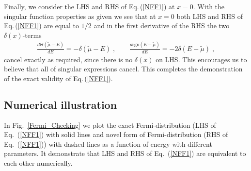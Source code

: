\documentclass[sn-mathphys,Numbered]{sn-jnl}
\theoremstyle{thmstyleone}%
\theoremstyle{thmstyletwo}%
\theoremstyle{thmstylethree}%
\begin{document}
Finally, we consider the LHS and RHS of Eq.\,(\ref{NFF1}) at $x=0$. With the singular function properties as given we see that at $x=0$ both LHS and RHS of Eq.\,(\ref{NFF1}) are equal to $1/2$ and in the first derivative of the  RHS the two $\delta(x)$-terms 
\begin{align}\label{NFF1b}
\frac{d\Theta(\tilde\mu-E)}{dE}=-\delta(\tilde\mu-E)\;,\qquad 
\frac{d\mathrm{sgn}(E -\tilde\mu)}{dE}=-2\delta(E-\tilde\mu)\;, 
 \end{align}
cancel exactly as required, since there is no $\delta(x)$ on LHS. This encourages us to believe that all of singular expressions cancel. This completes the demonstration of the exact validity of  Eq.\,(\ref{NFF1}). 

\subsection{Numerical illustration}
In Fig.~\ref{Fermi_Checking} we plot the exact Fermi-distribution (LHS of Eq.~(\ref{NFF1}) with solid lines and novel form of Fermi-distribution (RHS of Eq.~(\ref{NFF1})) with dashed lines as a function of energy with different parameters. It demonstrate that 
LHS and RHS of Eq.~(\ref{NFF1}) are equivalent to each other numerically.
\end{document}
